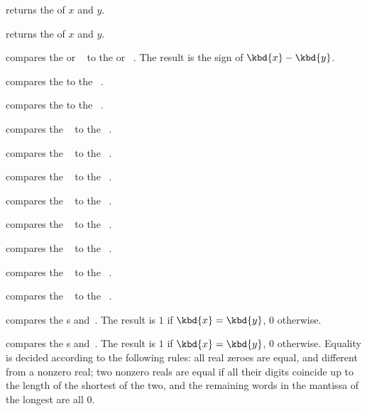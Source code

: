 

 returns the  of $x$ and $y$.




 returns the  of $x$ and $y$.

\smallskip

 compares the  or ~
to the  or ~. The result is the sign of
$\kbd{x}-\kbd{y}$.

 compares the   to the
~.

 compares the   to the
~.

 compares the ~ to the
~.

 compares the ~ to the
~.

 compares the ~ to the
~.

 compares the ~ to the
~.

 compares the ~ to the
~.

 compares the ~ to the
~.

 compares the ~ to the
~.

 compares the ~ to the
~.

 compares the s  and~.
The result is $1$ if $\kbd{x} = \kbd{y}$, $0$ otherwise.

 compares the s  and~.
The result is $1$ if $\kbd{x} = \kbd{y}$, $0$ otherwise. Equality is decided
according to the following rules: all real zeroes are equal, and
different from a nonzero real; two nonzero reals are equal if all their
digits coincide up to the length of the shortest of the two, and the
remaining words in the mantissa of the longest are all $0$.

